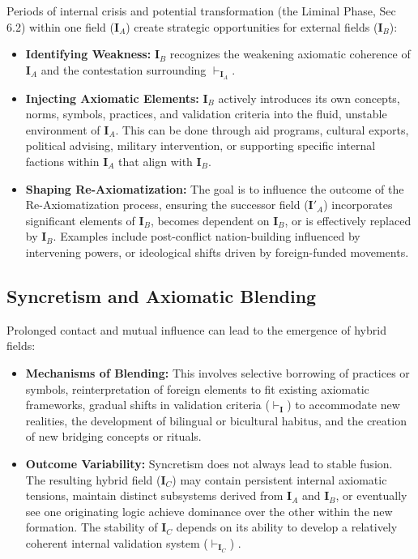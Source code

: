 \documentclass{article}
\newcommand{\Isness}{\mathbf{I}}            %
\newcommand{\validates}[1]{\ensuremath{\vdash_{#1}}} %
\begin{document}
Periods of internal crisis and potential transformation (the Liminal Phase, Sec 6.2) within one field ($\Isness_A$) create strategic opportunities for external fields ($\Isness_B$):
\begin{itemize}
    \item \textbf{Identifying Weakness:} $\Isness_B$ recognizes the weakening axiomatic coherence of $\Isness_A$ and the contestation surrounding $\validates{\Isness_A}$.
    \item \textbf{Injecting Axiomatic Elements:} $\Isness_B$ actively introduces its own concepts, norms, symbols, practices, and validation criteria into the fluid, unstable environment of $\Isness_A$. This can be done through aid programs, cultural exports, political advising, military intervention, or supporting specific internal factions within $\Isness_A$ that align with $\Isness_B$.
    \item \textbf{Shaping Re-Axiomatization:} The goal is to influence the outcome of the Re-Axiomatization process, ensuring the successor field ($\Isness'_A$) incorporates significant elements of $\Isness_B$, becomes dependent on $\Isness_B$, or is effectively replaced by $\Isness_B$. Examples include post-conflict nation-building influenced by intervening powers, or ideological shifts driven by foreign-funded movements.
\end{itemize}

\subsection{Syncretism and Axiomatic Blending}

Prolonged contact and mutual influence can lead to the emergence of hybrid fields:
\begin{itemize}
    \item \textbf{Mechanisms of Blending:} This involves selective borrowing of practices or symbols, reinterpretation of foreign elements to fit existing axiomatic frameworks, gradual shifts in validation criteria ($\validates{\Isness}$) to accommodate new realities, the development of bilingual or bicultural habitus, and the creation of new bridging concepts or rituals.
    \item \textbf{Outcome Variability:} Syncretism does not always lead to stable fusion. The resulting hybrid field ($\Isness_C$) may contain persistent internal axiomatic tensions, maintain distinct subsystems derived from $\Isness_A$ and $\Isness_B$, or eventually see one originating logic achieve dominance over the other within the new formation. The stability of $\Isness_C$ depends on its ability to develop a relatively coherent internal validation system ($\validates{\Isness_C}$) \citep{Luhmann1995}.
\end{itemize}
\end{document}
